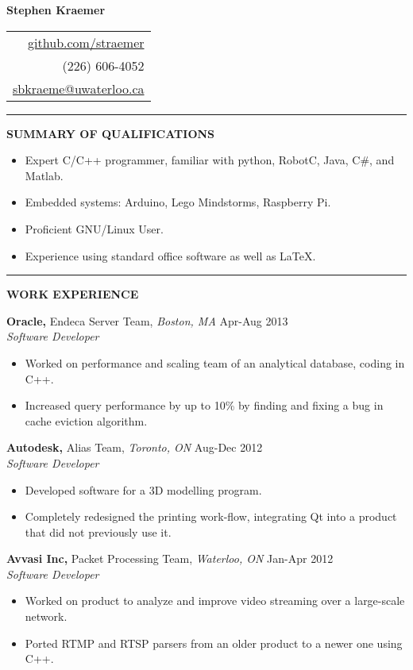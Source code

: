 \documentclass{letter}
\begin{document}
{\Huge\bf Stephen Kraemer} \hfill
\begin{tabular}{r}
  \href{https://github.com/straemer}{github.com/straemer} \\
  (226) 606-4052 \\
  \href{mailto:sbkraeme@uwaterloo.ca}{sbkraeme@uwaterloo.ca}
\end{tabular}

\vskip 2pt
\hrule

{\large\bf SUMMARY OF QUALIFICATIONS}

\begin{itemize}
  \item Expert C/C++ programmer, familiar with python, RobotC, Java, C\#, and Matlab.
  \item Embedded systems: Arduino, Lego Mindstorms, Raspberry Pi.
  \item Proficient GNU/Linux User.
  \item Experience using standard office software as well as LaTeX.
\end{itemize}

\vskip 2pt
\hrule
{\large\bf WORK EXPERIENCE}

{\bf Oracle,} Endeca Server Team, {\sl Boston, MA} \hfill Apr-Aug 2013 \\
{\sl Software Developer}
\begin{itemize}
  \item Worked on performance and scaling team of an analytical database, coding in C++.
  \item Increased query performance by up to 10\% by finding and fixing a bug in cache eviction algorithm.
\end{itemize}

{\bf Autodesk,} Alias Team, {\sl Toronto, ON} \hfill Aug-Dec 2012 \\
{\sl Software Developer}
\begin{itemize}
  \item Developed software for a 3D modelling program.
  \item Completely redesigned the printing work-flow, integrating Qt into a product that did not previously use it.
\end{itemize}

{\bf Avvasi Inc,} Packet Processing Team, {\sl Waterloo, ON} \hfill Jan-Apr 2012 \\
{\sl Software Developer}
\begin{itemize}
  \item Worked on product to analyze and improve video streaming over a large-scale network.
  \item Ported RTMP and RTSP parsers from an older product to a newer one using C++.
\end{itemize}
\end{document}
